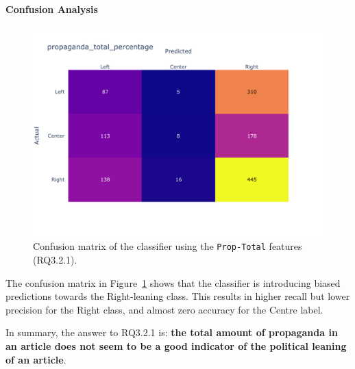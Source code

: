 \paragraph{Confusion Analysis}

\begin{figure}[!htbp]
    \centering
    \includegraphics[width=0.75\linewidth]{figures/baly_media_confusion_matrix_propaganda_total_percentage.pdf}
    \caption{Confusion matrix of the classifier using the \texttt{Prop-Total} features (RQ3.2.1).}
    \label{fig:total_prop_confusion}
\end{figure}

The confusion matrix in Figure~\ref{fig:total_prop_confusion} shows that the classifier is introducing biased predictions towards the Right-leaning class. %
This results in higher recall but lower precision for the Right class, and almost zero accuracy for the Centre label. 

In summary, the answer to RQ3.2.1 is: \textbf{the total amount of propaganda in an article does not seem to be a good indicator of the political leaning of an article}.


